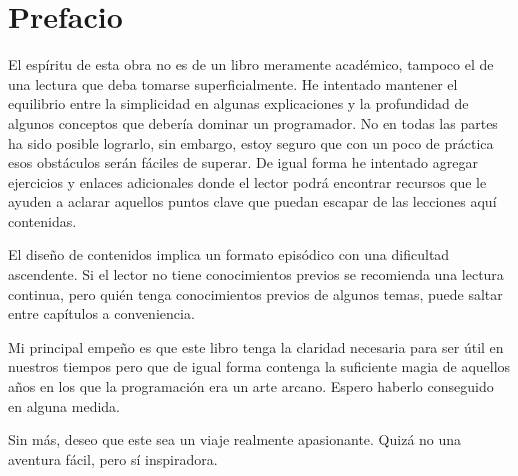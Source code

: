\thispagestyle{empty}

\chapter{Prefacio}


El espíritu de esta obra no es de un libro meramente académico, tampoco el de una lectura que deba tomarse superficialmente. He intentado mantener el equilibrio entre la simplicidad en algunas explicaciones y la profundidad de algunos conceptos que debería dominar un programador. No en todas las partes ha sido posible lograrlo, sin embargo, estoy seguro que con un poco de práctica esos obstáculos serán fáciles de superar. De igual forma he intentado agregar ejercicios y enlaces adicionales donde el lector podrá encontrar recursos que le ayuden a aclarar aquellos puntos clave que puedan escapar de las lecciones aquí contenidas.

El diseño de contenidos implica un formato episódico con una dificultad ascendente. Si el lector no tiene conocimientos previos se recomienda una lectura continua, pero quién tenga conocimientos previos de algunos temas, puede saltar entre capítulos a conveniencia.

Mi principal empeño es que este libro tenga la claridad necesaria para ser útil en nuestros tiempos pero que de igual forma contenga la suficiente magia de aquellos años en los que la programación era un arte arcano. Espero haberlo conseguido en alguna medida.

Sin más, deseo que este sea un viaje realmente apasionante. Quizá no una aventura fácil, pero sí inspiradora. 



